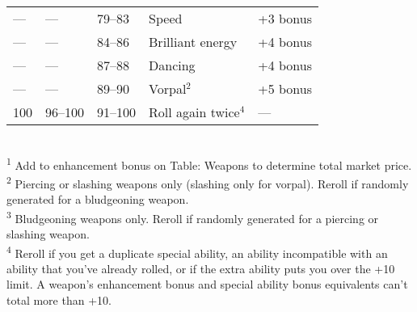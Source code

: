 \begin{table}[]
\begin{tabular}{lllll}
--- & --- & 79--83 & Speed & +3 bonus\\
--- & --- & 84--86 & Brilliant energy & +4 bonus\\
--- & --- & 87--88 & Dancing & +4 bonus\\
--- & --- & 89--90 & Vorpal\(^{2}\) & +5 bonus\\
100 & 96--100 & 91--100 & Roll again twice\(^{4}\) & ---\\
\end{tabular}\\
\textsuperscript{1} Add to enhancement bonus on Table: Weapons to determine total market price. \\
\textsuperscript{2} Piercing or slashing weapons only (slashing only for vorpal). Reroll if randomly generated for a bludgeoning weapon. \\
\textsuperscript{3} Bludgeoning weapons only. Reroll if randomly generated for a piercing or slashing weapon. \\
\textsuperscript{4} Reroll if you get a duplicate special ability, an ability incompatible with an ability that you've already rolled, or if the extra ability puts you over the +10 limit. A weapon's enhancement bonus and special ability bonus equivalents can't total more than +10.\\
\end{table}
		
